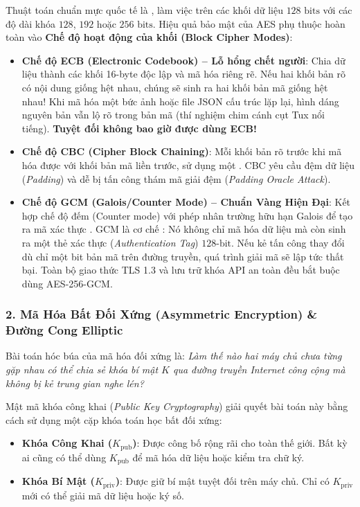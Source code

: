 Thuật toán chuẩn mực quốc tế là , làm việc trên các khối dữ liệu $128\text{ bits}$ với các độ dài khóa $128$, $192$ hoặc $256\text{ bits}$. Hiệu quả bảo mật của AES phụ thuộc hoàn toàn vào \textbf{Chế độ hoạt động của khối (Block Cipher Modes)}:
\begin{itemize}
  \item \textbf{Chế độ ECB (Electronic Codebook) -- Lỗ hổng chết người}: Chia dữ liệu thành các khối 16-byte độc lập và mã hóa riêng rẽ. Nếu hai khối bản rõ có nội dung giống hệt nhau, chúng sẽ sinh ra hai khối bản mã giống hệt nhau! Khi mã hóa một bức ảnh hoặc file JSON cấu trúc lặp lại, hình dáng nguyên bản vẫn lộ rõ trong bản mã (thí nghiệm chim cánh cụt Tux nổi tiếng). \textbf{Tuyệt đối không bao giờ được dùng ECB!}
  \item \textbf{Chế độ CBC (Cipher Block Chaining)}: Mỗi khối bản rõ trước khi mã hóa được  với khối bản mã liền trước, sử dụng một . CBC yêu cầu đệm dữ liệu (\textit{Padding}) và dễ bị tấn công thám mã giải đệm (\textit{Padding Oracle Attack}).
  \item \textbf{Chế độ GCM (Galois/Counter Mode) -- Chuẩn Vàng Hiện Đại}: Kết hợp chế độ đếm (Counter mode) với phép nhân trường hữu hạn Galois để tạo ra mã xác thực . GCM là cơ chế : Nó không chỉ mã hóa dữ liệu mà còn sinh ra một thẻ xác thực (\textit{Authentication Tag}) $128\text{-bit}$. Nếu kẻ tấn công thay đổi dù chỉ một bit bản mã trên đường truyền, quá trình giải mã sẽ lập tức thất bại. Toàn bộ giao thức TLS 1.3 và lưu trữ khóa API an toàn đều bắt buộc dùng AES-256-GCM.
\end{itemize}

\subsubsection{2. Mã Hóa Bất Đối Xứng (Asymmetric Encryption) \& Đường Cong Elliptic}
Bài toán hóc búa của mã hóa đối xứng là: \textit{Làm thế nào hai máy chủ chưa từng gặp nhau có thể chia sẻ khóa bí mật $K$ qua đường truyền Internet công cộng mà không bị kẻ trung gian nghe lén?}

Mật mã khóa công khai (\textit{Public Key Cryptography}) giải quyết bài toán này bằng cách sử dụng một cặp khóa toán học bất đối xứng:
\begin{itemize}
  \item \textbf{Khóa Công Khai ($K_{\text{pub}}$)}: Được công bố rộng rãi cho toàn thế giới. Bất kỳ ai cũng có thể dùng $K_{\text{pub}}$ để mã hóa dữ liệu hoặc kiểm tra chữ ký.
  \item \textbf{Khóa Bí Mật ($K_{\text{priv}}$)}: Được giữ bí mật tuyệt đối trên máy chủ. Chỉ có $K_{\text{priv}}$ mới có thể giải mã dữ liệu hoặc ký số.
\end{itemize}


